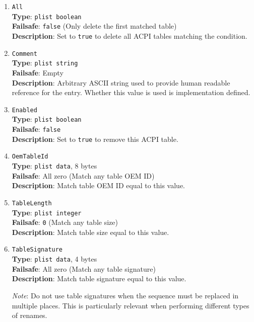 \documentclass[]{article}
\begin{document}
\begin{enumerate}
\item
  \texttt{All}\\
  \textbf{Type}: \texttt{plist\ boolean}\\
  \textbf{Failsafe}: \texttt{false} (Only delete the first matched table)\\
  \textbf{Description}: Set to \texttt{true} to delete all ACPI tables matching the
  condition.

\item
  \texttt{Comment}\\
  \textbf{Type}: \texttt{plist\ string}\\
  \textbf{Failsafe}: Empty\\
  \textbf{Description}: Arbitrary ASCII string used to provide human readable
  reference for the entry. Whether this value is used is implementation defined.

\item
  \texttt{Enabled}\\
  \textbf{Type}: \texttt{plist\ boolean}\\
  \textbf{Failsafe}: \texttt{false}\\
  \textbf{Description}: Set to \texttt{true} to remove this ACPI table.

\item
  \texttt{OemTableId}\\
  \textbf{Type}: \texttt{plist\ data}, 8 bytes\\
  \textbf{Failsafe}: All zero (Match any table OEM ID)\\
  \textbf{Description}: Match table OEM ID equal to this value.

\item
  \texttt{TableLength}\\
  \textbf{Type}: \texttt{plist\ integer}\\
  \textbf{Failsafe}: \texttt{0} (Match any table size)\\
  \textbf{Description}: Match table size equal to this value.

\item
  \texttt{TableSignature}\\
  \textbf{Type}: \texttt{plist\ data}, 4 bytes\\
  \textbf{Failsafe}: All zero (Match any table signature)\\
  \textbf{Description}: Match table signature equal to this value.

  \emph{Note}: Do not use table signatures when the sequence
  must be replaced in multiple places. This is particularly relevant
  when performing different types of renames.

\end{enumerate}
\end{document}
